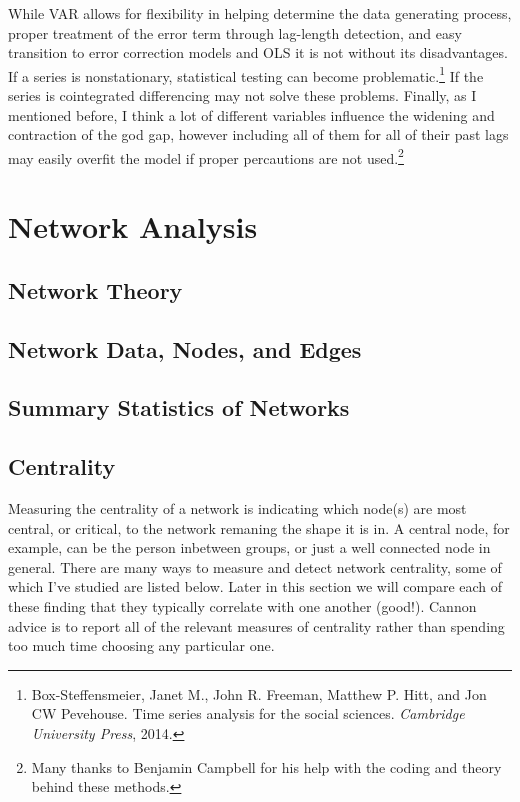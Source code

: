 \documentclass[12pt]{article}\usepackage[]{graphicx}\usepackage[]{color}
\begin{document}
\begin{flushleft}
While VAR allows for flexibility in helping determine the data generating process, proper treatment of the error term through lag-length detection, and easy transition to error correction models and OLS it is not without its disadvantages. If a series is nonstationary, statistical testing can become problematic.\footnote{Box-Steffensmeier, Janet M., John R. Freeman, Matthew P. Hitt, and Jon CW Pevehouse. Time series analysis for the social sciences. \textit{Cambridge University Press}, 2014.} If the series is cointegrated differencing may not solve these problems. Finally, as I mentioned before, I think a lot of different variables influence the widening and contraction of the god gap, however including all of them for all of their past lags may easily overfit the model if proper percautions are not used.\footnote{Many thanks to Benjamin Campbell for his help with the coding and theory behind these methods.}



\clearpage
\section{Network Analysis}

\subsection{Network Theory}

\subsection{Network Data, Nodes, and Edges}

\subsection{Summary Statistics of Networks}

\subsection{Centrality}

Measuring the centrality of a network is indicating which node(s) are most central, or critical, to the network remaning the shape it is in. A central node, for example, can be the person inbetween groups, or just a well connected node in general. There are many ways to measure and detect network centrality, some of which I've studied are listed below. Later in this section we will compare each of these finding that they typically correlate with one another (good!). Cannon advice is to report all of the relevant measures of centrality rather than spending too much time choosing any particular one.


\end{flushleft}
\end{document}
